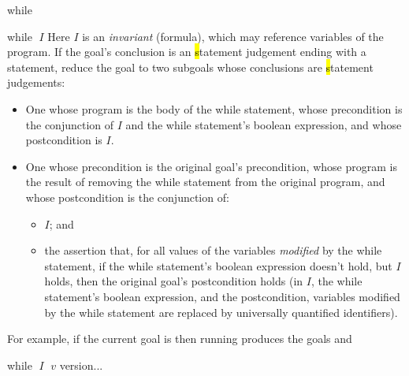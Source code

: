 \begin{tactic}{while}
  \begin{tsyntax}{while $\;I$}
    Here $I$ is an \emph{invariant} (formula), which may reference
    variables of the program.  If the goal's conclusion is an \hl
    statement judgement ending with a  statement, reduce the
    goal to two subgoals whose conclusions are \hl statement
    judgements:
    \begin{itemize}
    \item One whose program is the body of the while statement, whose
      precondition is the conjunction of $I$ and the while statement's
      boolean expression, and whose postcondition is $I$.

    \item One whose precondition is the original goal's precondition,
      whose program is the result of removing the while statement from
      the original program, and whose postcondition is the conjunction
      of:
      \begin{itemize}
      \item $I$; and

      \item the assertion that, for all values of the variables
        \emph{modified} by the while statement, if the while statement's boolean
        expression doesn't hold, but $I$ holds, then the original
        goal's postcondition holds (in $I$, the while statement's boolean
        expression, and the postcondition, variables modified by the
        while statement are replaced by universally quantified
        identifiers).
      \end{itemize}
    \end{itemize}

  \bigskip
  For example, if the current goal is
   then
  running 
  produces the goals
  and
  \end{tsyntax}

  \begin{tsyntax}{while $\;I$ $\;v$}
  \phl version...

  \end{tsyntax}
\end{tactic}
